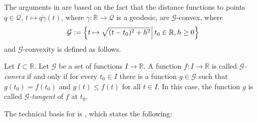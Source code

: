 \documentclass{article}
\newcommand*{\mc}[1]{\mathcal{#1}}
\newcommand{\R}{\mathbb{R}}
\newcommand{\lcb}{\left\lbrace} %
\newcommand{\rcb}{\right\rbrace} %
\newcommand{\cb}[1]{\lcb #1 \rcb} %
\newcommand{\sizedMid}[2]{#1 \, \kern-\nulldelimiterspace\mathopen{}\left| \vphantom{#1}\,#2\right.\mathclose{}\kern-\nulldelimiterspace}
\newcommand{\setByEle}[2]{\cb{\sizedMid{#1}{#2}}}
\newcommand{\ol}[2]{\overline{#1#2}}
\begin{document}
The arguments in \cite{varinequ} are based on the fact that the distance functions to points $q\in\mc Q$, $t \mapsto \ol q\gamma(t)$, where $\gamma\colon\R\to\mc Q$ is a geodesic, are $\mc G$-convex, where 
\begin{equation}
    \mc G := \setByEle{t\mapsto \sqrt{(t-t_0)^2+h^2}}{t_0 \in \R, h\geq 0}
\end{equation}
and $\mc G$-convexity is defined as follows.
\begin{definition}\label{def:Fconvex}
    Let $I\subset\R$. Let $\mc G$ be a set of functions $I \to \R$.
    A function $f\colon I\to\R$ is called \emph{$\mc G$-convex} if and only if for every $t_0\in I$ there is a function $g\in\mc G$ such that $g(t_0) = f(t_0)$ and $g(t) \leq f(t)$ for all $t\in I$. In this case, the function $g$ is called \emph{$\mc G$-tangent} of $f$ at $t_0$.
\end{definition}
The technical basis for \cite[Theorem 5.4]{varinequ} is \cite[Theorem 4.17 (ii)]{varinequ}, which states the following:
\end{document}
